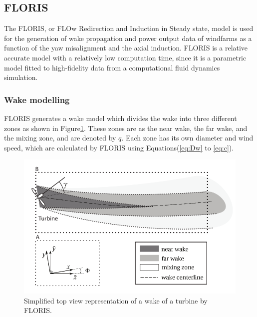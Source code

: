 
\subsection{FLORIS} The FLORIS, or FLOw Redirection and Induction in Steady state, model is used for the generation of wake propagation and power output data of windfarms as a function of the yaw misalignment and the axial induction\cite{Gebraad2016}.
FLORIS is a relative accurate model\cite{Dijk2016} with a relatively low computation time, since it is a parametric model fitted to high-fidelity data from a computational fluid dynamics simulation. 

\subsubsection{Wake modelling}
\label{wakemodel}
FLORIS generates a wake model which divides the wake into three different zones as shown in Figure\ref{fig:wake}. These zones are as the near wake, the far wake, and the mixing zone, and are denoted by $q$. Each zone has its own diameter and wind speed, which are calculated by FLORIS using Equations(\ref{eq:Dw} to \ref{eq:c}). 


\begin{figure}
  	\includegraphics[width=\linewidth]{./Figures/WakeFLORIS.png}
  	\caption{Simplified top view representation of a wake of a turbine by FLORIS.\cite{Gebraad2016}   }
	\label{fig:wake}
\end{figure}

